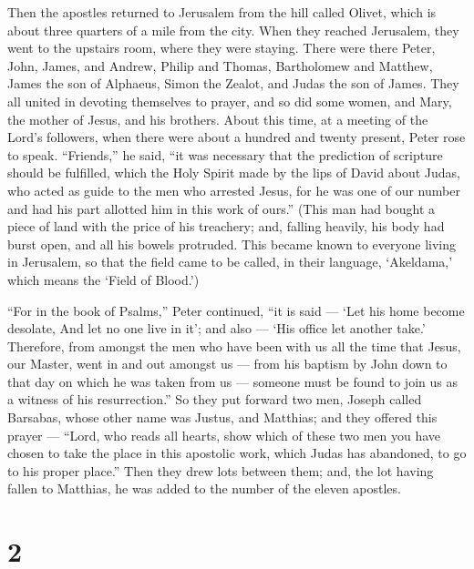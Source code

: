  Then the apostles returned to Jerusalem from the hill
called Olivet, which is about three quarters of a mile from the city.
 When they reached Jerusalem, they went to the upstairs
room, where they were staying. There were there Peter, John, James, and
Andrew, Philip and Thomas, Bartholomew and Matthew, James the son of
Alphaeus, Simon the Zealot, and Judas the son of James. 
They all united in devoting themselves to prayer, and so did some women,
and Mary, the mother of Jesus, and his brothers.  About
this time, at a meeting of the Lord's followers, when there were about a
hundred and twenty present, Peter rose to speak. 
``Friends,'' he said, ``it was necessary that the prediction of
scripture should be fulfilled, which the Holy Spirit made by the lips of
David about Judas, who acted as guide to the men who arrested Jesus,
 for he was one of our number and had his part allotted him
in this work of ours.''  (This man had bought a piece of
land with the price of his treachery; and, falling heavily, his body had
burst open, and all his bowels protruded.  This became
known to everyone living in Jerusalem, so that the field came to be
called, in their language, `Akeldama,' which means the `Field of
Blood.')

 ``For in the book of Psalms,'' Peter continued, ``it is
said --- `Let his home become desolate, And let no one live in it'; and
also --- `His office let another take.'  Therefore, from
amongst the men who have been with us all the time that Jesus, our
Master, went in and out amongst us ---  from his baptism by
John down to that day on which he was taken from us --- someone must be
found to join us as a witness of his resurrection.''  So
they put forward two men, Joseph called Barsabas, whose other name was
Justus, and Matthias;  and they offered this prayer ---
``Lord, who reads all hearts, show which of these two men you have
chosen  to take the place in this apostolic work, which
Judas has abandoned, to go to his proper place.''  Then
they drew lots between them; and, the lot having fallen to Matthias, he
was added to the number of the eleven apostles.

\hypertarget{section-1}{%
\section{2}\label{section-1}}

